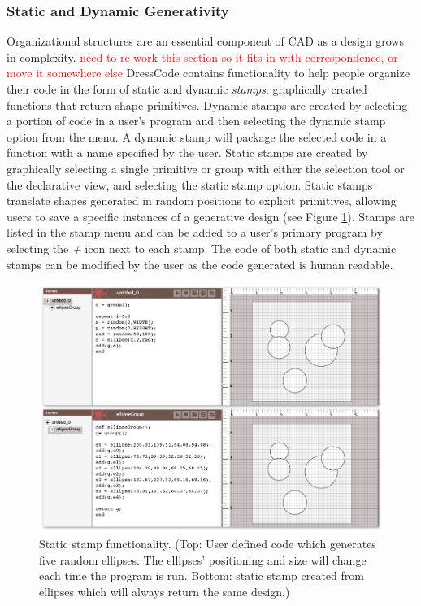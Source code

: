 \documentclass{sigchi}
\begin{document}
\subsubsection{Static and Dynamic Generativity}
Organizational structures are an essential component of CAD as a design grows in complexity. \textcolor{red}{need to re-work this section so it fits in with correspondence, or move it somewhere else} DressCode contains functionality to help people organize their code in the form of static and dynamic \textit{stamps}: graphically created functions that return shape primitives. Dynamic stamps are created by selecting a portion of code in a user's program and then selecting the dynamic stamp option from the menu. A dynamic stamp will package the selected code in a function with a name specified by the user. Static stamps are created by graphically selecting a single primitive or group with either the selection tool or the declarative view, and selecting the static stamp option. Static stamps translate shapes generated in random positions to explicit primitives, allowing users to save a specific instances of a generative design (see Figure \ref{fig:stamps}).
Stamps are listed in the stamp menu and can be added to a user's primary program by selecting the \textit{+} icon next to each stamp. The code of both static and dynamic stamps can be modified by the user as the code generated is human readable.

\begin{center}
\begin{figure}[h!]
\includegraphics[width=\columnwidth]{images/stamps.jpg}
\caption{Static stamp functionality. (Top: User defined code which generates five random ellipses. The ellipses' positioning and size will change each time the program is run. Bottom: static stamp created from ellipses which will always return the same design.)}
\label{fig:stamps}
\end{figure}
\end{center}
\vspace{-20pt}
\end{document}
